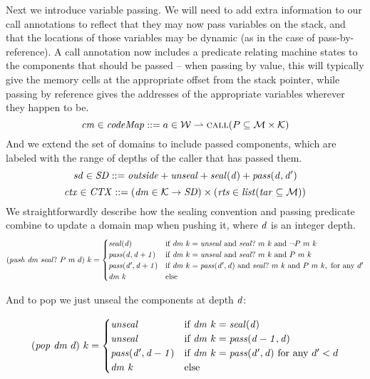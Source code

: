 \documentclass[acmsmall,review,anonymous]{acmart}\settopmatter{printfolios=true,printccs=false,printacmref=false}
\begin{document}
Next we introduce variable passing. We will need to add extra information to our call
annotations to reflect that they may now pass variables on the stack, and that the locations
of those variables may be dynamic (as in the case of pass-by-reference).
A call annotation now includes a predicate relating machine states to the components
that should be passed -- when passing by value, this will typically give the memory cells
at the appropriate offset from the stack pointer, while passing by reference gives the
addresses of the appropriate variables wherever they happen to be.
\[\mathit{cm} \in \mathit{codeMap} ::= a \in {\mathcal W} \rightharpoonup \text{\sc call}(P \subseteq {\mathcal M} \times {\mathcal K})\]
And we extend the set of domains to include passed components,
which are labeled with the range of depths of the caller that has passed them.
\[\mathit{sd} \in \mathit{SD} ::= \mathit{outside} + \mathit{unseal} + \mathit{seal(d)} + \mathit{pass(d,d')}\]
\[\mathit{ctx} \in \mathit{CTX} ::= (\mathit{dm} \in {\mathcal K} \rightarrow \mathit{SD})
\times (\mathit{rts} \in \mathit{list} (\mathit{tar} \subseteq {\mathcal M})) \]
We straightforwardly describe how the sealing convention and passing predicate combine to
update a domain map when pushing it, where \(d\) is an integer depth.
\[(\mathit{push} ~ \mathit{dm} ~ \mathit{seal?} ~ P ~ m ~ d) ~ k =
\begin{cases}
  \mathit{seal(d)}              & \text{if } \mathit{dm} ~ k = \mathit{unseal} \text{ and }
                                 \mathit{seal?} ~ m ~ k \text{ and } \neg P ~ m ~ k \\
  \mathit{pass(d,d+1)}     & \text{if } \mathit{dm} ~ k = \mathit{unseal} \text{ and }
                                 \mathit{seal?} ~ m ~ k \text{ and } P ~ m ~ k \\
  \mathit{pass(d',d+1)}    & \text{if } \mathit{dm} ~ k = \mathit{pass(d',d)} \text{ and }
                                 \mathit{seal?} ~ m ~ k \text{ and } P ~ m ~ k,
                                 \text{ for any } d' \\
  \mathit{dm}~k & \text{else} \\
\end{cases}\]

And to pop we just unseal the components at depth \(d\):

\[(\mathit{pop} ~ \mathit{dm} ~ d) ~ k =
\begin{cases}
  \mathit{unseal}                 & \text{if } \mathit{dm} ~ k = \mathit{seal(d)} \\
  \mathit{unseal}                 & \text{if } \mathit{dm} ~ k = \mathit{pass(d-1,d)} \\
  \mathit{pass(d',d-1)} & \text{if } \mathit{dm} ~ k = \mathit{pass(d',d)}
                              \text{ for any } d' < d \\
  \mathit{dm}~k        & \text{else} \\
\end{cases}\]
\end{document}
